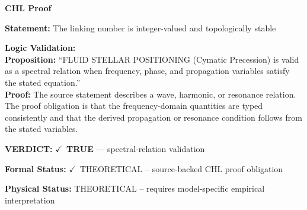 \vspace{0.45em}
\noindent\textbf{CHL Proof}\par
\textbf{Statement:} The linking number is integer-valued and topologically stable

\textbf{Logic Validation:}\\
\textbf{Proposition:} ``FLUID STELLAR POSITIONING (Cymatic Precession) is valid as a spectral relation when
frequency, phase, and propagation variables satisfy the stated equation.''\\
\textbf{Proof:} The source statement describes a wave, harmonic, or resonance relation. The proof
obligation is that the frequency-domain quantities are typed consistently and that the
derived propagation or resonance condition follows from the stated variables.

\textbf{VERDICT:} \ensuremath{\checkmark}\ \textbf{TRUE} --- spectral-relation validation

\textbf{Formal Status:} \ensuremath{\checkmark}\ THEORETICAL -- source-backed CHL proof obligation

\textbf{Physical Status:} THEORETICAL -- requires model-specific empirical interpretation
\par\vspace{0.45em}
\par
\ifTZPDarkEdition
{}
\fi
\endgroup
\endgroup
